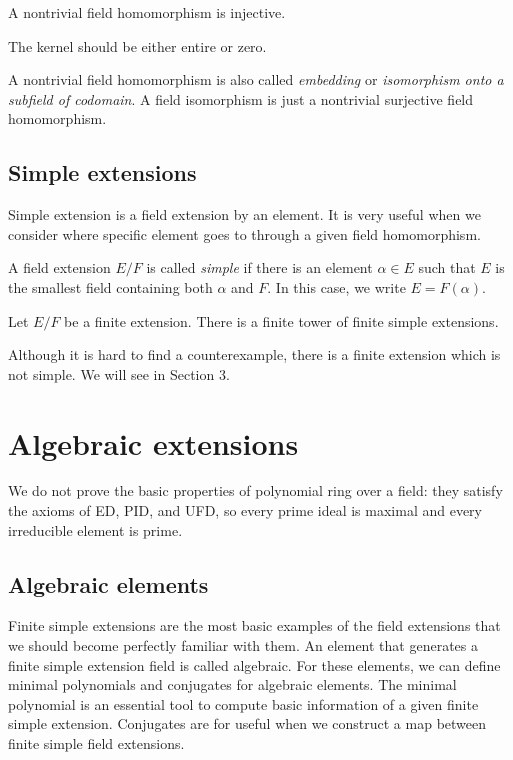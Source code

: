 \documentclass{../exp}
\begin{document}
\begin{prop}
A nontrivial field homomorphism is injective.
\end{prop}
\begin{pf}
The kernel should be either entire or zero.
\end{pf}
A nontrivial field homomorphism is also called \emph{embedding} or \emph{isomorphism onto a subfield of codomain}.
A field isomorphism is just a nontrivial surjective field homomorphism.



\subsection{Simple extensions}
Simple extension is a field extension by an element.
It is very useful when we consider where specific element goes to through a given field homomorphism.

\begin{defn}
A field extension $E/F$ is called \emph{simple} if there is an element $\alpha\in E$ such that $E$ is the smallest field containing both $\alpha$ and $F$.
In this case, we write $E=F(\alpha)$.
\end{defn}

\begin{lem}
Let $E/F$ be a finite extension.
There is a finite tower of finite simple extensions.
\end{lem}

Although it is hard to find a counterexample, there is a finite extension which is not simple.
We will see in Section 3.












\section{Algebraic extensions}

We do not prove the basic properties of polynomial ring over a field: they satisfy the axioms of ED, PID, and UFD, so every prime ideal is maximal and every irreducible element is prime.

\subsection{Algebraic elements}
Finite simple extensions are the most basic examples of the field extensions that we should become perfectly familiar with them.
An element that generates a finite simple extension field is called algebraic.
For these elements, we can define minimal polynomials and conjugates for algebraic elements.
The minimal polynomial is an essential tool to compute basic information of a given finite simple extension.
Conjugates are for useful when we construct a map between finite simple field extensions.
\end{document}
